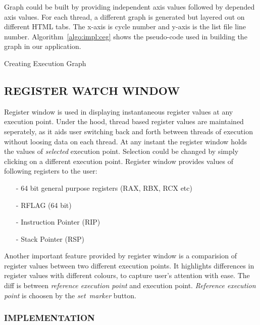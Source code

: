 Graph could be built by providing independent axis values followed by depended axis values. For each thread, a different graph is generated but layered out on different HTML tabs. The x-axis is cycle number and y-axis is the list file line number. Algorithm~\ref{algo:impl:ceg} shows the pseudo-code used in building the graph in our application.

\IncMargin{1em}
\begin{algorithm}[h]
\DontPrintSemicolon
{} 
\KwFn{}
\BlankLine
{}
\caption{Creating Execution Graph}
\label{algo:impl:ceg}
\end{algorithm}\DecMargin{1em}

\subsection {REGISTER WATCH WINDOW}
\label{sec:impl:rww}
Register window is used in displaying instantaneous register values at any execution point. Under the hood, thread based register values are maintained seperately, as it aids user switching back and forth between threads of execution without loosing data on each thread. At any instant the register window holds the values of {\it selected} execution point. Selection could be changed by simply clicking on a different execution point. Register window provides values of following registers to the user:
\begin{itemize}
	\item[-] 64 bit general purpose registers (RAX, RBX, RCX etc)
	\item[-] RFLAG (64 bit)
	\item[-] Instruction Pointer (RIP)
	\item[-] Stack Pointer (RSP)
\end{itemize}

Another important feature provided by register window is a comparision of register values between two different execution points. It highlights differences in register values with different colours, to capture user's attention with ease. The diff is between {\it reference execution point} and {\selected execution point}. {\it Reference execution point} is choosen by the {\it set~marker} button.

\subsubsection{IMPLEMENTATION}

